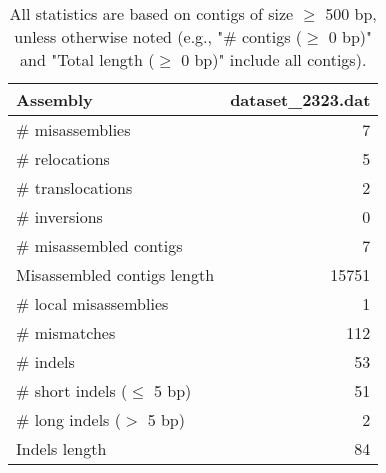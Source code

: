 \documentclass[12pt,a4paper]{article}
\begin{document}
\begin{table}[ht]
\begin{center}
\caption{All statistics are based on contigs of size $\geq$ 500 bp, unless otherwise noted (e.g., "\# contigs ($\geq$ 0 bp)" and "Total length ($\geq$ 0 bp)" include all contigs).}
\begin{tabular}{|l*{1}{|r}|}
\hline
Assembly & dataset\_2323.dat \\ \hline
\# misassemblies & 7 \\ \hline
\hspace{5mm}\# relocations & 5 \\ \hline
\hspace{5mm}\# translocations & 2 \\ \hline
\hspace{5mm}\# inversions & 0 \\ \hline
\# misassembled contigs & 7 \\ \hline
Misassembled contigs length & 15751 \\ \hline
\# local misassemblies & 1 \\ \hline
\# mismatches & 112 \\ \hline
\# indels & 53 \\ \hline
\hspace{5mm}\# short indels ($\leq$ 5 bp) & 51 \\ \hline
\hspace{5mm}\# long indels ($>$ 5 bp) & 2 \\ \hline
Indels length & 84 \\ \hline
\end{tabular}
\end{center}
\end{table}
\end{document}
